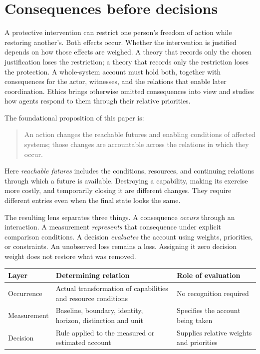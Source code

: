 \documentclass[11pt,a4paper]{article}
\theoremstyle{remark}
\begin{document}
\section{Consequences before decisions}\label{sec:introduction}

A protective intervention can restrict one person's freedom of action while
restoring another's. Both effects occur. Whether the intervention is justified
depends on how those effects are weighed. A theory that records only the chosen
justification loses the restriction; a theory that records only the restriction
loses the protection. A whole-system account must hold both, together with
consequences for the actor, witnesses, and the relations that enable later
coordination. Ethics brings otherwise omitted consequences into view and studies how agents
respond to them through their relative priorities.

The foundational proposition of this paper is:
\begin{quote}
An action changes the reachable futures and enabling conditions of affected
systems; those changes are accountable across the relations in which they occur.
\end{quote}
Here \emph{reachable futures} includes the conditions, resources, and continuing
relations through which a future is available. Destroying a capability, making
its exercise more costly, and temporarily closing it are different changes.
They require different entries even when the final state looks the same.

The resulting lens separates three things. A consequence \emph{occurs} through
an interaction. A measurement \emph{represents} that consequence under explicit
comparison conditions. A decision \emph{evaluates} the account using weights,
priorities, or constraints. An unobserved loss remains a loss. Assigning it zero
decision weight does not restore what was removed.

\begin{center}
\begin{tabular}{@{}p{}p{}p{}@{}}
\toprule
Layer & Determining relation & Role of evaluation \\
\midrule
Occurrence & Actual transformation of capabilities and resource conditions & No recognition required \\
Measurement & Baseline, boundary, identity, horizon, distinction and unit & Specifies the account being taken \\
Decision & Rule applied to the measured or estimated account & Supplies relative weights and priorities \\
\bottomrule
\end{tabular}
\end{center}
\end{document}
